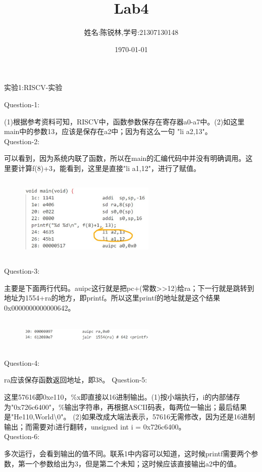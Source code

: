 \documentclass[12pt]{article}
\title{Lab4}
\author{姓名:陈锐林,学号:21307130148}
\date{\today}
\begin{document}
\maketitle
\begin{Large}
	\noindent 实验1:RISCV-实验\\
\end{Large}
Question-1:\par
(1)根据参考资料可知，RISCV中，函数参数保存在寄存器a0-a7中。(2)如这里main中的参数13，应该是保存在a2中；因为有这么一句
"li a2,13"。\\
Question-2:\par
可以看到，因为系统内联了函数，所以在main的汇编代码中并没有明确调用。这里要计算f(8)+3，能看到，这里是直接"li a1,12"，进行了赋值。
\begin{figure}[H]
    \centering
    \includegraphics[height=4cm,width=6.5cm]{lab4-1.jpg}
\end{figure}
\noindent Question-3:\par
主要是下面两行代码。auipc这行就是把pc+(常数>>12)给ra；下一行就是跳转到地址为1554+ra的地方，即printf。所以这里printf的地址就是这个结果0x0000000000000642。
\begin{figure}[H]
    \centering
    \includegraphics[height=1.5cm,width=6.5cm]{lab4-2.jpg}
\end{figure}
\noindent Question-4:\par
ra应该保存函数返回地址，即38。
\newpage
\noindent Question-5:\par
这里57616即0xe110，\%x即直接以16进制输出。(1)按小端执行，i的内部储存为"0x726c6400"，\%输出字符串，再根据ASCII码表，每两位一输出；最后结果是"He110,World\textbackslash{}0"。
(2)如果改成大端法表示，57616无需修改，因为还是16进制输出；而需要对i进行翻转，unsigned int i = 0x726c6400。\\
Question-6:\par
多次运行，会看到输出的值不同。联系1中内容可以知道，这时候printf需要两个参数，第一个参数给出为3，但是第二个未知；这时候应该直接输出a2中的值。\\
\end{document}
